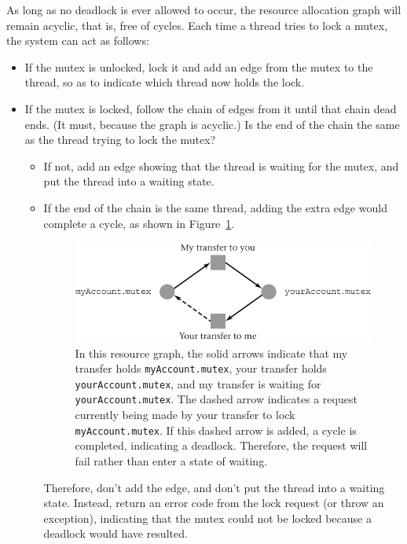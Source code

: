 As long as no deadlock is ever allowed to occur, the resource
allocation graph will remain acyclic, that is, free of cycles.  Each time a thread tries to
lock a mutex, the system can act as follows:
\begin{itemize}
\item
If the mutex is unlocked, lock it and add an edge from the mutex to
the thread, so as to indicate which thread now holds the lock.
\item
If the mutex is locked, follow the chain of edges from it until that
chain dead ends.  (It must, because the graph is acyclic.)  Is the end
of the chain the same as the thread trying to lock the mutex?
\begin{itemize}
\item
If not, add an edge showing that the thread is waiting for the mutex,
and put the thread into a waiting state.
\item
If the end of the chain is the same thread, adding the extra edge would complete a cycle, as shown in
Figure~\ref{idd-rg-figure}.
\begin{figure}
\centerline{\includegraphics{hail_f0424}}

\caption{In this resource graph, the solid arrows indicate that my
  transfer holds {\tt myAccount.mutex}, your transfer holds {\tt
  yourAccount.mutex}, and my transfer is waiting for {\tt
  yourAccount.mutex}.  The dashed arrow indicates a request currently
  being made by your transfer to lock {\tt myAccount.mutex}. If this
  dashed arrow is added, a
  cycle is completed, indicating a deadlock.  Therefore, the request
  will fail rather than enter a state of waiting.}
\label{idd-rg-figure}
\end{figure}
Therefore, don't add the edge, and don't put
the thread into a waiting state.  Instead, return an error code from the
lock request (or throw an exception), indicating that the mutex could
not be locked because a deadlock would have resulted.
\end{itemize}
\end{itemize}

